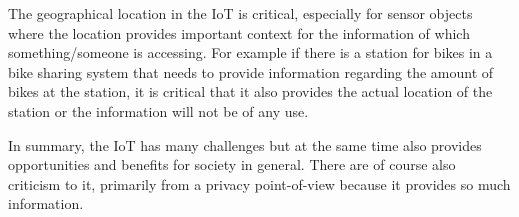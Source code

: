 The geographical location in the IoT is critical, especially for sensor objects where the location provides important context for the information of which something/someone is accessing\citep{misc:locationMatters}.
For example if there is a station for bikes in a bike sharing system that needs to provide information regarding the amount of bikes at the station, it is critical that it also provides the actual location of the station or the information will not be of any use.

In summary, the IoT has many challenges but at the same time also provides opportunities and benefits for society in general. There are of course also criticism to it, primarily from a privacy point-of-view because it provides so much information. 